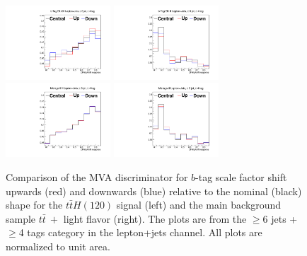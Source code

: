 \begin{description}
\begin{figure}[hbtp]
 \begin{center}
   \includegraphics[width=0.35\textwidth]{Figures/Analysis_1_Diagrams/SystPlot_CMS_eff_b_ttH120_ljets_jge6_tge4}
   \includegraphics[width=0.35\textwidth]{Figures/Analysis_1_Diagrams/SystPlot_CMS_eff_b_ttbar_ljets_jge6_tge4}
   \includegraphics[width=0.35\textwidth]{Figures/Analysis_1_Diagrams/SystPlot_CMS_fake_b_ttH120_ljets_jge6_tge4}
   \includegraphics[width=0.35\textwidth]{Figures/Analysis_1_Diagrams/SystPlot_CMS_fake_b_ttbar_ljets_jge6_tge4}
   \caption{ Comparison of the MVA discriminator for  $b$-tag scale factor shift upwards
     (red) and downwards (blue) relative to the nominal (black) shape
     for the $t\bar{t}H(120)$ signal (left) and the main background sample
     $t\bar{t}~+$ light flavor (right).  The plots are from the $\ge$6
     jets + $\ge$4 tags category in the lepton+jets channel.  All
     plots are normalized to unit area.}\label{fig:btagSFShift}
 \end{center}
\end{figure}



\end{description}
